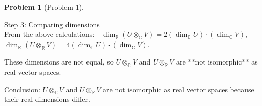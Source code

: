 \documentclass[12pt]{article}
\theoremstyle{definition}
\newtheorem{problem}{Problem}
\begin{document}
\begin{problem}[Problem 1]
\begin{solution}
        Step 3: Comparing dimensions\\
        From the above calculations:
        - $\dim_\mathbb{R}(U \otimes_\mathbb{C} V) = 2 (\dim_\mathbb{C} U) \cdot (\dim_\mathbb{C} V)$,
        - $\dim_\mathbb{R}(U \otimes_\mathbb{R} V) = 4 (\dim_\mathbb{C} U) \cdot (\dim_\mathbb{C} V)$.

        These dimensions are not equal, so $U \otimes_\mathbb{C} V$ and $U \otimes_\mathbb{R} V$ are **not isomorphic** as real vector spaces.

        Conclusion:
        $U \otimes_\mathbb{C} V$ and $U \otimes_\mathbb{R} V$ are not isomorphic as real vector spaces because their real dimensions differ.
    
    \end{solution}
\end{problem}
\end{document}
